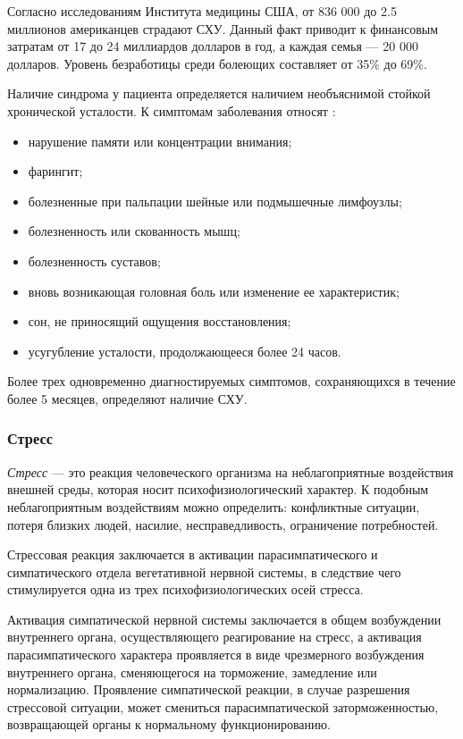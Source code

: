 Согласно исследованиям Института медицины США, от 836 000 до 2.5 миллионов американцев страдают СХУ. Данный факт приводит к финансовым затратам от 17 до 24 миллиардов долларов в год, а каждая семья --- 20 000 долларов. Уровень безработицы среди болеющих составляет от 35\% до 69\%. \cite{fatigueChronoInvestigation}

Наличие синдрома у пациента определяется наличием необъяснимой стойкой хронической усталости. К симптомам заболевания относят \cite{syndromOfChrono}:
\begin{itemize}[leftmargin=1.6\parindent]
\item нарушение памяти или концентрации внимания;
\item фарингит;
\item болезненные при пальпации шейные или подмышечные лимфоузлы;
\item болезненность или скованность мышц;
\item болезненность суставов;
\item вновь возникающая головная боль или изменение ее характеристик;
\item сон, не приносящий ощущения восстановления;
\item усугубление усталости, продолжающееся более 24 часов.
\end{itemize}

Более трех одновременно диагностируемых симптомов, сохраняющихся в течение более 5 месяцев, определяют наличие СХУ. \cite{syndromOfChrono}


\subsubsection{Стресс}
\textit{Стресс} --- это реакция человеческого организма на неблагоприятные воздействия внешней среды, которая носит психофизиологический характер. К подобным неблагоприятным воздействиям можно определить: конфликтные ситуации, потеря близких людей, насилие, несправедливость, ограничение потребностей. \cite{neuroPhysicalMechasmsOfStress}

Стрессовая реакция заключается в активации парасимпатического и симпатического отдела вегетативной нервной системы, в следствие чего стимулируется одна из трех психофизиологических осей стресса. \cite{neuroPhysicalMechasmsOfStress}

Активация симпатической нервной системы заключается в общем возбуждении внутреннего органа, осуществляющего реагирование на стресс, а активация парасимпатического характера проявляется в виде чрезмерного возбуждения внутреннего органа, сменяющегося на торможение, замедление или нормализацию. Проявление симпатической реакции, в случае разрешения стрессовой ситуации, может смениться парасимпатической заторможенностью, возвращающей органы к нормальному функционированию. \cite{neuroPhysicalMechasmsOfStress}

